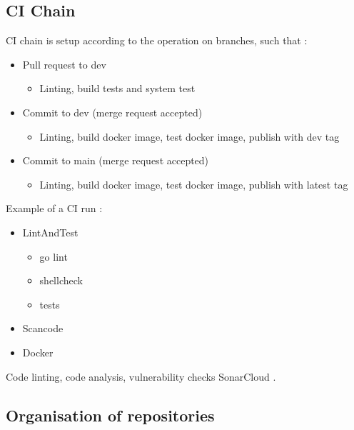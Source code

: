 \subsection{CI Chain}
CI chain is setup according to the operation on branches, such that \cite{issue69}\cite{issue117}: 
\begin{itemize}
    \item Pull request to dev
    \begin{itemize}
        \item Linting, build tests and system test
    \end{itemize}
    
    \item Commit to dev (merge request accepted)
    \begin{itemize}
        \item Linting, build docker image, test docker image, publish with dev tag
    \end{itemize}
    
    \item Commit to main (merge request accepted)
    \begin{itemize}
        \item Linting, build docker image, test docker image, publish with latest tag
    \end{itemize}
\end{itemize}


Example of a CI run \cite{ci_run_example_1}: 
\begin{itemize}
    \item LintAndTest
    \begin{itemize}
        \item go lint \cite{golinter.sh}
        \item shellcheck \cite{shellchecker.sh}
        \item tests 
    \end{itemize}
    \item Scancode \cite{scancode_dockerfile}
    \item Docker 
\end{itemize}

Code linting, code analysis, vulnerability checks \cite{issue113}
SonarCloud \cite{issue114}. 


\subsection{Organisation of repositories}

